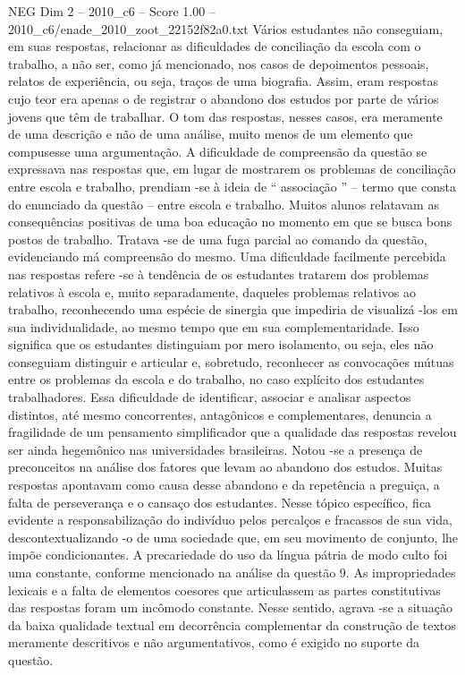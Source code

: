 \begin{textsample}{NEG Dim 2 – 2010\_c6 – Score 1.00 – 2010\_c6/enade\_2010\_zoot\_22152f82a0.txt}
Vários estudantes não conseguiam, em suas respostas, relacionar as dificuldades de conciliação da escola com o trabalho, a não ser, como já mencionado, nos casos de depoimentos pessoais, relatos de experiência, ou seja, traços de uma biografia.
Assim, eram respostas cujo teor era apenas o de registrar o abandono dos estudos por parte de vários jovens que têm de trabalhar.
O tom das respostas, nesses casos, era meramente de uma descrição e não de uma análise, muito menos de um elemento que compusesse uma argumentação.
A dificuldade de compreensão da questão se expressava nas respostas que, em lugar de mostrarem os problemas de conciliação entre escola e trabalho, prendiam -se à ideia de “ associação ” – termo que consta do enunciado da questão – entre escola e trabalho.
Muitos alunos relatavam as consequências positivas de uma boa educação no momento em que se busca bons postos de trabalho.
Tratava -se de uma fuga parcial ao comando da questão, evidenciando má compreensão do mesmo.
Uma dificuldade facilmente percebida nas respostas refere -se à tendência de os estudantes tratarem dos problemas relativos à escola e, muito separadamente, daqueles problemas relativos ao trabalho, reconhecendo uma espécie de sinergia que impediria de visualizá -los em sua individualidade, ao mesmo tempo que em sua complementaridade.
Isso significa que os estudantes distinguiam por mero isolamento, ou seja, eles não conseguiam distinguir e articular e, sobretudo, reconhecer as convocações mútuas entre os problemas da escola e do trabalho, no caso explícito dos estudantes trabalhadores.
Essa dificuldade de identificar, associar e analisar aspectos distintos, até mesmo concorrentes, antagônicos e complementares, denuncia a fragilidade de um pensamento simplificador que a qualidade das respostas revelou ser ainda hegemônico nas universidades brasileiras.
Notou -se a presença de preconceitos na análise dos fatores que levam ao abandono dos estudos.
Muitas respostas apontavam como causa desse abandono e da repetência a preguiça, a falta de perseverança e o cansaço dos estudantes.
Nesse tópico específico, fica evidente a responsabilização do indivíduo pelos percalços e fracassos de sua vida, descontextualizando -o de uma sociedade que, em seu movimento de conjunto, lhe impõe condicionantes.
A precariedade do uso da língua pátria de modo culto foi uma constante, conforme mencionado na análise da questão 9.
As impropriedades lexicais e a falta de elementos coesores que articulassem as partes constitutivas das respostas foram um incômodo constante.
Nesse sentido, agrava -se a situação da baixa qualidade textual em decorrência complementar da construção de textos meramente descritivos e não argumentativos, como é exigido no suporte da questão.

\end{textsample}
